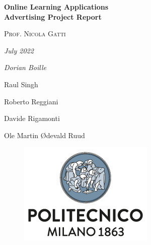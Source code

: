 

\begin{titlepage}
    \centering
    \vspace*{2em}
    
    {\Huge\bfseries Online Learning Applications \\ Advertising Project Report \par}
    
    \vspace{4em}
    
    {\large\scshape Prof. Nicola Gatti \par} 
    
    \vspace{3em}
    
    {\large\slshape July 2022 \par}
    
    \vspace{3em}
    
    {
        \large\itshape 
        Dorian Boille
        \par
        Raul Singh
        \par
        Roberto Reggiani
        \par
        Davide Rigamonti
        \par
        Ole Martin Ødevald Ruud
        \par
    }
    
    \vfill
    
    \begin{figure}[b]
        \includegraphics[scale=0.6]{img/polimi.png} 
        \centering
    \end{figure}
\end{titlepage}

